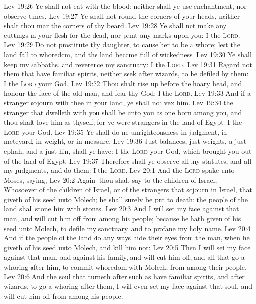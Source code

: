 \vs Lev 19:26 Ye shall not eat  with the blood: neither shall ye use enchantment, nor observe times.
\vs Lev 19:27 Ye shall not round the corners of your heads, neither shalt thou mar the corners of thy beard.
\vs Lev 19:28 Ye shall not make any cuttings in your flesh for the dead, nor print any marks upon you: I  the \textsc{Lord}.
\vs Lev 19:29 Do not prostitute thy daughter, to cause her to be a whore; lest the land fall to whoredom, and the land become full of wickedness.
\vs Lev 19:30 Ye shall keep my sabbaths, and reverence my sanctuary: I  the \textsc{Lord}.
\vs Lev 19:31 Regard not them that have familiar spirits, neither seek after wizards, to be defiled by them: I  the \textsc{Lord} your God.
\vs Lev 19:32 Thou shalt rise up before the hoary head, and honour the face of the old man, and fear thy God: I  the \textsc{Lord}.
\vs Lev 19:33 And if a stranger sojourn with thee in your land, ye shall not vex him.
\vs Lev 19:34  the stranger that dwelleth with you shall be unto you as one born among you, and thou shalt love him as thyself; for ye were strangers in the land of Egypt: I  the \textsc{Lord} your God.
\vs Lev 19:35 Ye shall do no unrighteousness in judgment, in meteyard, in weight, or in measure.
\vs Lev 19:36 Just balances, just weights, a just ephah, and a just hin, shall ye have: I  the \textsc{Lord} your God, which brought you out of the land of Egypt.
\vs Lev 19:37 Therefore shall ye observe all my statutes, and all my judgments, and do them: I  the \textsc{Lord}.
\vs Lev 20:1 And the \textsc{Lord} spake unto Moses, saying,
\vs Lev 20:2 Again, thou shalt say to the children of Israel, Whosoever  of the children of Israel, or of the strangers that sojourn in Israel, that giveth  of his seed unto Molech; he shall surely be put to death: the people of the land shall stone him with stones.
\vs Lev 20:3 And I will set my face against that man, and will cut him off from among his people; because he hath given of his seed unto Molech, to defile my sanctuary, and to profane my holy name.
\vs Lev 20:4 And if the people of the land do any ways hide their eyes from the man, when he giveth of his seed unto Molech, and kill him not:
\vs Lev 20:5 Then I will set my face against that man, and against his family, and will cut him off, and all that go a whoring after him, to commit whoredom with Molech, from among their people.
\vs Lev 20:6 And the soul that turneth after such as have familiar spirits, and after wizards, to go a whoring after them, I will even set my face against that soul, and will cut him off from among his people.
